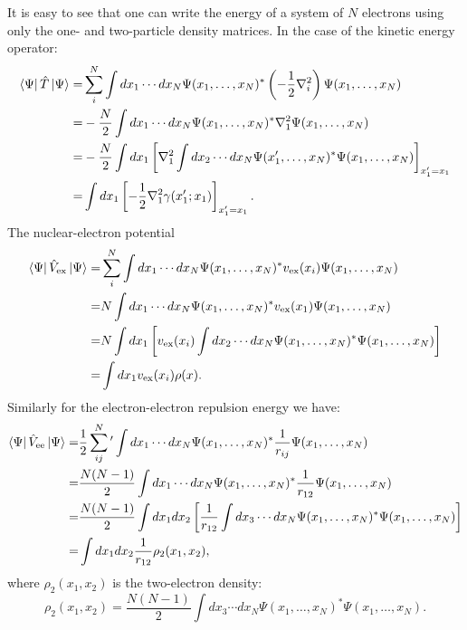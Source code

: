 \documentclass[../Main/chem532-notes.tex]{subfiles}
\begin{document}
It is easy to see that one can write the energy of a system of $N$ electrons using only the one- and two-particle density matrices.
In the case of the kinetic energy operator:
\begin{equation}
\begin{split}
\bra{\Psi}\hat{T} \ket{\Psi}
=& \sum_i^N  \int dx_1 \cdots dx_N \Psi(x_1,\ldots,x_N)^* \left(-\frac{1}{2}\nabla_i^2\right) \Psi(x_1,\ldots,x_N) \\
=& -\frac{N}{2} \int dx_1 \cdots dx_N \Psi(x_1,\ldots,x_N)^* \nabla_1^2 \Psi(x_1,\ldots,x_N) \\
=& -\frac{N}{2} \int dx_1 \left[ \nabla_1^2 \int dx_2 \cdots dx_N \Psi(x_1',\ldots,x_N)^* \Psi(x_1,\ldots,x_N)\right]_{x_1' = x_1}\\
=& \int dx_1 \left[-\frac{1}{2}\nabla_1^2 \gamma(x_1';x_1)\right]_{x_1' = x_1}.
\end{split}
\end{equation}
The nuclear-electron potential
\begin{equation}
\begin{split}
\bra{\Psi}\hat{V}_{\rm ex} \ket{\Psi}
=& \sum_i^N  \int dx_1 \cdots dx_N \Psi(x_1,\ldots,x_N)^* v_{\rm ex}(x_i) \Psi(x_1,\ldots,x_N) \\
=& N \int dx_1 \cdots dx_N \Psi(x_1,\ldots,x_N)^* v_{\rm ex}(x_1) \Psi(x_1,\ldots,x_N) \\
=& N\int dx_1 \left[ v_{\rm ex}(x_i)  \int dx_2 \cdots dx_N \Psi(x_1,\ldots,x_N)^* \Psi(x_1,\ldots,x_N)\right]\\
=& \int dx_1 v_{\rm ex}(x_i) \rho(x).
\end{split}
\end{equation}
Similarly for the electron-electron repulsion energy we have:
\begin{equation}
\begin{split}
\bra{\Psi}\hat{V}_{\rm ee} \ket{\Psi}
=& \frac{1}{2}\sum_{ij}^N{'}  \int dx_1 \cdots dx_N \Psi(x_1,\ldots,x_N)^* \frac{1}{r_{ij}}\Psi(x_1,\ldots,x_N) \\
=& \frac{N(N-1)}{2} \int dx_1 \cdots dx_N \Psi(x_1,\ldots,x_N)^* \frac{1}{r_{12}}\Psi(x_1,\ldots,x_N) \\
=& \frac{N(N-1)}{2}\int dx_1 dx_2 \left[ \frac{1}{r_{12}}  \int dx_3 \cdots dx_N \Psi(x_1,\ldots,x_N)^* \Psi(x_1,\ldots,x_N)\right]\\
=& \int dx_1 dx_2   \frac{1}{r_{12}} \rho_2(x_1,x_2),
\end{split}
\end{equation}
where $\rho_2(x_1,x_2)$ is the two-electron density:
\begin{equation}
\rho_2(x_1,x_2) = \frac{N(N-1)}{2} \int dx_3 \cdots dx_N \Psi(x_1,\ldots,x_N)^* \Psi(x_1,\ldots,x_N).
\end{equation}
\end{document}
